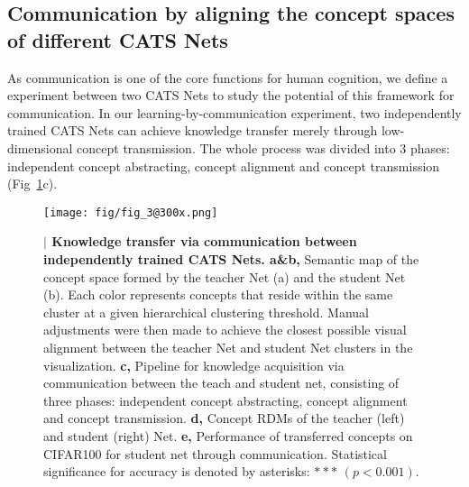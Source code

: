 \documentclass[pdflatex,sn-mathphys-num,lineno]{sn-jnl}%
\begin{document}
\begin{CJK}{UTF8}{gbsn}
\subsection{Communication by aligning the concept spaces of different CATS Nets}
As communication is one of the core functions for human cognition, we define a experiment between two CATS Nets to study the potential of this framework for communication. In our learning-by-communication experiment, two independently trained CATS Nets can achieve knowledge transfer merely through low-dimensional concept transmission. The whole process was divided into 3 phases: independent concept abstracting, concept alignment and concept transmission (Fig~\ref{fig3}c).

\begin{figure}[h]
\centering
\texttt{[image: fig/fig\_3@300x.png]}
\caption{\textbf{$\vert$ Knowledge transfer via communication between independently trained CATS Nets. a\&b,} Semantic map of the concept space formed by the teacher Net (a) and the student Net (b). Each color represents concepts that reside within the same cluster at a given hierarchical clustering threshold. Manual adjustments were then made to achieve the closest possible visual alignment between the teacher Net and student Net clusters in the visualization. \textbf{c,} Pipeline for knowledge acquisition via communication between the teach and student net, consisting of three phases: independent concept abstracting, concept alignment and concept transmission. \textbf{d,} Concept RDMs of the teacher (left) and student (right) Net. \textbf{e,} Performance of transferred concepts on CIFAR100 for student net through communication. Statistical significance for accuracy is denoted by asterisks: $***$ $(p < 0.001)$.}
\label{fig3}
\end{figure}


\end{CJK}
\end{document}
